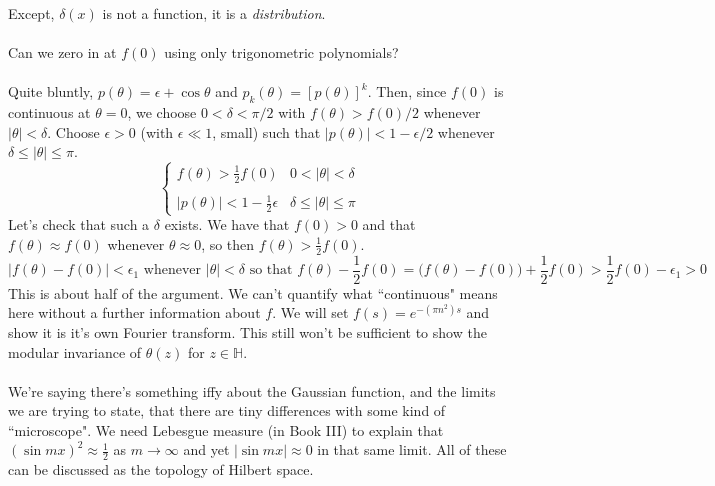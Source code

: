 \documentclass[12pt]{article}
\begin{document}
Except, $\delta(x)$ is not a function, it is a \textit{distribution}. \\ \\
Can we zero in at $f(0)$ using only trigonometric polynomials? \\ \\
Quite bluntly, $p(\theta) = \epsilon + \cos \theta$ and $p_k(\theta) = [p(\theta)]^k$.  Then, since $f(0)$ is continuous at $\theta = 0$, we choose $0 < \delta < \pi/2$ with $f(\theta) > f(0)/2$ whenever $|\theta| < \delta$.  Choose $\epsilon > 0$ (with $\epsilon \ll 1$, small) such that $|p(\theta)| < 1 - \epsilon / 2$ whenever $\delta \leq |\theta| \leq \pi$.  
$$ \left\{ \begin{array}{cc} f(\theta) > \frac{1}{2} f(0) & 0 < |\theta| < \delta \\ \\ 
|p(\theta)| < 1 - \frac{1}{2}\epsilon & \delta \leq |\theta| \leq \pi \end{array} \right. $$ 
Let's check that such a $\delta$ exists.  We have that $f(0) > 0$ and that $f(\theta) \approx f(0)$ whenever $\theta \approx 0$, so then $f(\theta) > \frac{1}{2}f(0)$. 
$$ |f(\theta) - f(0)| < \epsilon_1 \text{ whenever } |\theta| < \delta \text{ so that }
f(\theta) - \frac{1}{2}f(0) = \Big(f(\theta) - f(0)\Big) + \frac{1}{2}f(0) > \frac{1}{2}f(0) - \epsilon_1 > 0 $$ 
This is about half of the argument.  We can't quantify what ``continuous" means here without a further information about $f$. We will set $f(s) = e^{- (\pi n^2) s}$ and show it is it's own Fourier transform.  This still won't be sufficient to show the modular invariance of $\theta(z)$ for $z \in \mathbb{H}$. \\ \\
We're saying there's something iffy about the Gaussian function, and the limits we are trying to state, that there are tiny differences with some kind of ``microscope".  We need Lebesgue measure (in Book III) to explain that $(\sin mx)^2 \approx \frac{1}{2}$ as $m \to \infty$ and  yet $|\sin mx| \approx 0 $ in that same limit.   All of these can be discussed as the topology of Hilbert space.
\end{document}
